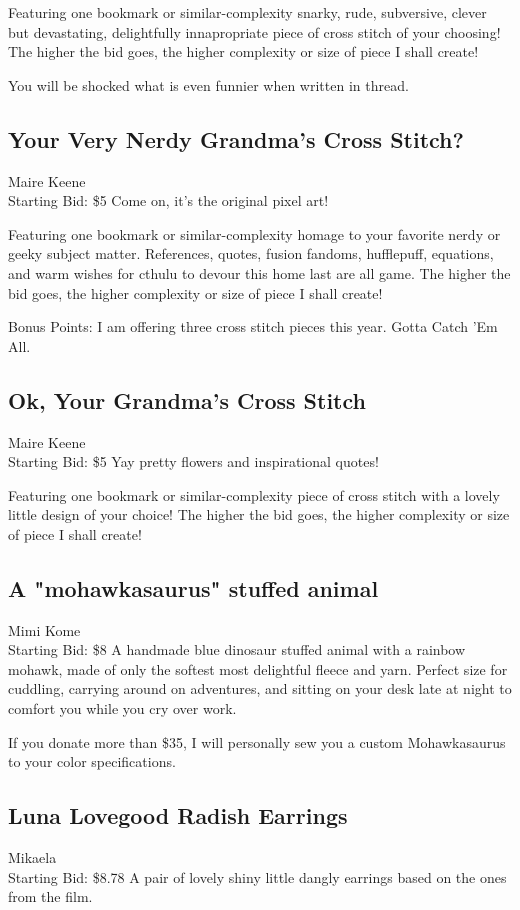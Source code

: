 \documentclass[11pt]{article}
\begin{document}
Featuring one bookmark or similar-complexity snarky, rude, subversive, clever but devastating, delightfully innapropriate piece of cross stitch of your choosing! The higher the bid goes, the higher complexity or size of piece I shall create!

You will be shocked what is even funnier when written in thread.
\subsection{Your Very Nerdy Grandma's Cross Stitch?}
Maire Keene
\\
Starting Bid: \$5
\newline
Come on, it's the original pixel art!

Featuring one bookmark or similar-complexity homage to your favorite nerdy or geeky subject matter. References, quotes, fusion fandoms, hufflepuff, equations, and warm wishes for cthulu to devour this home last are all game.  The higher the bid goes, the higher complexity or size of piece I shall create!

Bonus Points: I am offering three cross stitch pieces this year. 
Gotta Catch 'Em  All.
\subsection{Ok, Your Grandma's Cross Stitch}
Maire Keene
\\
Starting Bid: \$5
\newline
Yay pretty flowers and inspirational quotes!

Featuring one bookmark or similar-complexity piece of cross stitch with a lovely little design of your choice! The higher the bid goes, the higher complexity or size of piece I shall create!
\subsection{A "mohawkasaurus" stuffed animal}
Mimi Kome
\\
Starting Bid: \$8
\newline
A handmade blue dinosaur stuffed animal with a rainbow mohawk, made of only the softest most delightful fleece and yarn. Perfect size for cuddling, carrying around on adventures, and sitting on your desk late at night to comfort you while you cry over work. 

If you donate more than \$35, I will personally sew you a custom Mohawkasaurus to your color specifications.
\subsection{Luna Lovegood Radish Earrings}
Mikaela
\\
Starting Bid: \$8.78
\newline
A pair of lovely shiny little dangly earrings based on the ones from the film.
\end{document}
